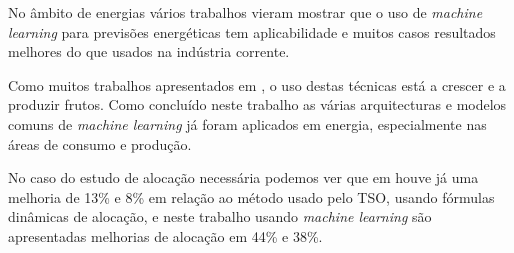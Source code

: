 No âmbito de energias vários trabalhos vieram mostrar que o uso de \textit{machine learning} para previsões energéticas tem aplicabilidade \cite{Stassen} e muitos casos resultados melhores do que usados na indústria corrente. \cite{Ahmad2020} \cite{Antonopoulos2020} \par
Como muitos trabalhos apresentados em \cite{Benti2023}, o uso destas técnicas está a crescer e a produzir frutos. Como concluído neste trabalho as várias arquitecturas e modelos comuns de \textit{machine learning} já foram aplicados em energia, especialmente nas áreas de consumo e produção.\par
No caso do estudo de alocação necessária podemos ver que em \cite{Algarvio2024} houve já uma melhoria de 13\% e 8\% em relação ao método usado pelo TSO, usando fórmulas dinâmicas de alocação, e neste trabalho usando \textit{machine learning} são apresentadas melhorias de alocação em 44\% e 38\%.\par






